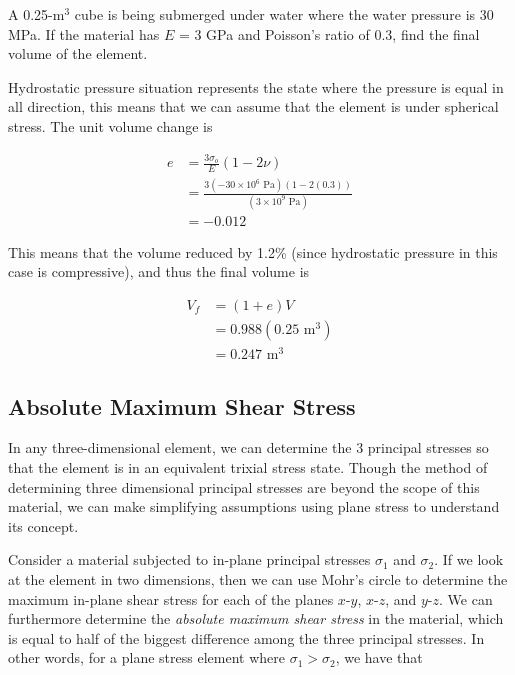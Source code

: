 \documentclass[
10pt,
a4paper,
openany,
svgnames,
]{kaobook} %
\begin{document}
\begin{example}
A 0.25-m$^3$ cube is being submerged under water where the water pressure is 30 MPa. If the material has $E$ = 3 GPa and Poisson’s ratio of 0.3, find the final volume of the element.
\end{example}
\begin{solution}
Hydrostatic pressure situation represents the state where the pressure is equal in all direction, this means that we can assume that the element is under spherical stress. The unit volume change is

\begin{align*}
  e &= \frac{3\sigma_o}{E}(1 - 2\nu ) \\ 
    &= \frac{3(-30 \times 10^6 \text{ Pa})(1 - 2(0.3))}{(3 \times 10^9 \text{ Pa})} \\ 
    &= -0.012 
\end{align*}	

This means that the volume reduced by 1.2\% (since hydrostatic pressure in this case is compressive), and thus the final volume is

\begin{align*}
  V_f &= (1 + e)V \\ 
      &= 0.988(0.25 \text{ m}^3) \\ 
      &= 0.247 \text{ m}^3
\end{align*}

\end{solution}

\subsection{Absolute Maximum Shear Stress}

In any three-dimensional element, we can determine the 3 principal stresses so that the element is in an equivalent trixial stress state. Though the method of determining three dimensional principal stresses are beyond the scope of this material, we can make simplifying assumptions using plane stress to understand its concept.

Consider a material subjected to in-plane principal stresses $\sigma_1$ and $\sigma_2$. If we look at the element in two dimensions, then we can use Mohr's circle to determine the maximum in-plane shear stress for each of the planes $x$-$y$, $x$-$z$, and $y$-$z$. We can furthermore determine the \emph{absolute maximum shear stress} in the material, which is equal to half of the biggest difference among the three principal stresses. In other words, for a plane stress element where $\sigma_1 > \sigma_2$, we have that
\end{document}
